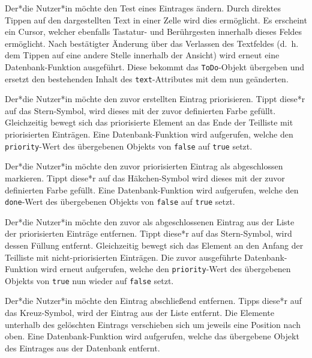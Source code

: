 Der*die Nutzer*in möchte den Test eines Eintrages ändern. Durch direktes Tippen auf den dargestellten Text in einer Zelle wird dies ermöglicht. Es erscheint ein Cursor, welcher ebenfalls Tastatur- und Berührgesten innerhalb dieses Feldes ermöglicht. Nach bestätigter Änderung über das Verlassen des Textfeldes (d.\ h. dem Tippen auf eine andere Stelle innerhalb der Ansicht) wird erneut eine Datenbank-Funktion ausgeführt. Diese bekommt das \texttt{ToDo}-Objekt übergeben und ersetzt den bestehenden Inhalt des \texttt{text}-Attributes mit dem nun geänderten.

Der*die Nutzer*in möchte den zuvor erstellten Eintrag priorisieren. Tippt diese*r auf das Stern-Symbol, wird dieses mit der zuvor definierten Farbe gefüllt. Gleichzeitig bewegt sich das priorisierte Element an das Ende der Teilliste mit priorisierten Einträgen. Eine Datenbank-Funktion wird aufgerufen, welche den \texttt{priority}-Wert des übergebenen Objekts von \texttt{false} auf \texttt{true} setzt.

Der*die Nutzer*in möchte den zuvor priorisierten Eintrag als abgeschlossen markieren. Tippt diese*r auf das Häkchen-Symbol wird dieses mit der zuvor definierten Farbe gefüllt. Eine Datenbank-Funktion wird aufgerufen, welche den \texttt{done}-Wert des übergebenen Objekts von \texttt{false} auf \texttt{true} setzt.

Der*die Nutzer*in möchte den zuvor als abgeschlossenen Eintrag aus der Liste der priorisierten Einträge entfernen. Tippt diese*r auf das Stern-Symbol, wird dessen Füllung entfernt. Gleichzeitig bewegt sich das Element an den Anfang der Teilliste mit nicht-priorisierten Einträgen. Die zuvor ausgeführte Datenbank-Funktion wird erneut aufgerufen, welche den \texttt{priority}-Wert des übergebenen Objekts von \texttt{true} nun wieder auf \texttt{false} setzt.

Der*die Nutzer*in möchte den Eintrag abschließend entfernen. Tipps diese*r auf das Kreuz-Symbol, wird der Eintrag aus der Liste entfernt. Die Elemente unterhalb des gelöschten Eintrags verschieben sich um jeweils eine Position nach oben. Eine Datenbank-Funktion wird aufgerufen, welche das übergebene Objekt des Eintrages aus der Datenbank entfernt.


